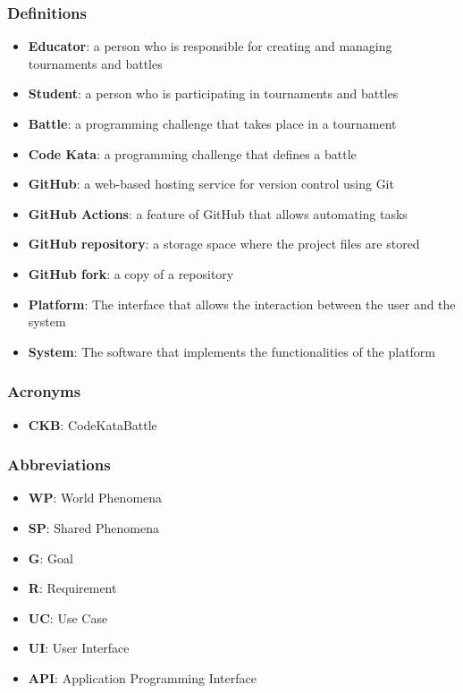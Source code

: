 \subsubsection{Definitions}
\begin{itemize}
    \item \textbf{Educator}: a person who is responsible for creating and managing tournaments and battles
    \item \textbf{Student}: a person who is participating in tournaments and battles
    \item \textbf{Battle}: a programming challenge that takes place in a tournament
    \item \textbf{Code Kata}: a programming challenge that defines a battle
    \item \textbf{GitHub}: a web-based hosting service for version control using Git
    \item \textbf{GitHub Actions}: a feature of GitHub that allows automating tasks
    \item \textbf{GitHub repository}: a storage space where the project files are stored
    \item \textbf{GitHub fork}: a copy of a repository
    \item \textbf{Platform}: The interface that allows the interaction between the user and the system
    \item \textbf{System}: The software that implements the functionalities of the platform
\end{itemize}
\subsubsection{Acronyms}
\begin{itemize}
    \item \textbf{CKB}: CodeKataBattle
\end{itemize}
\subsubsection{Abbreviations}
\begin{itemize}
    \item \textbf{WP}: World Phenomena
    \item \textbf{SP}: Shared Phenomena
    \item \textbf{G}: Goal
    \item \textbf{R}: Requirement
    \item \textbf{UC}: Use Case
    \item \textbf{UI}: User Interface
    \item \textbf{API}: Application Programming Interface
\end{itemize}
